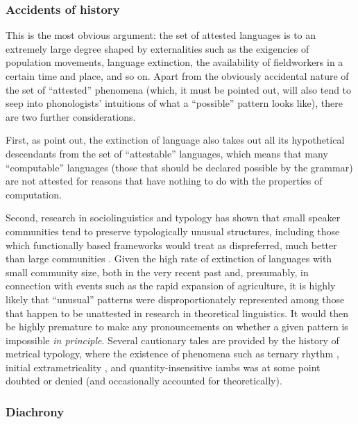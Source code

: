 \subsubsection{Accidents of history}
\label{sec:accidents-history}

This is the most obvious argument: the set of attested languages is to an extremely large degree shaped by externalities such as the exigencies of population movements, language extinction, the availability of fieldworkers in a certain time and place, and so on. Apart from the obviously accidental nature of the set of \enquote{attested} phenomena (which, it must be pointed out, will also tend to seep into phonologists' intuitions of what a \enquote{possible} pattern looks like), there are two further considerations.

First, as \citet{hale-kissock-reiss} point out, the extinction of language also takes out all its hypothetical descendants from the set of \enquote{attestable} languages, which means that many \enquote{computable} languages (\ie those that should be declared possible by the grammar) are not attested for reasons that have nothing to do with the properties of computation.

Second, research in sociolinguistics and typology has shown that small speaker communities tend to preserve typologically unusual structures, including those which functionally based frameworks would treat as dispreferred, much better than large communities \citep{nettle99:_is,nettle99:_using_social_impac_theor,trudgill10:_inves,trudgill11:_sociol,wohlgemuth10:_languag}. Given the high rate of extinction of languages with small community size, both in the very recent past and, presumably, in connection with events such as the rapid expansion of agriculture, it is highly likely that \enquote{unusual} patterns were disproportionately represented among those that happen to be unattested in research in theoretical linguistics. It would then be highly premature to make any pronouncements on whether a given pattern is impossible \emph{in principle}. Several cautionary tales are provided by the history of metrical typology, where the existence of phenomena such as ternary rhythm \citep{curt-diss}, initial extrametricality \citep{buckley92:_theor_kashay}, and quantity\hyp insensitive iambs \citep{altshuler09:_quant_insen_iambs_osage} was at some point doubted or denied (and occasionally accounted for theoretically).

\subsubsection{Diachrony}
\label{sec:diachrony-1}

